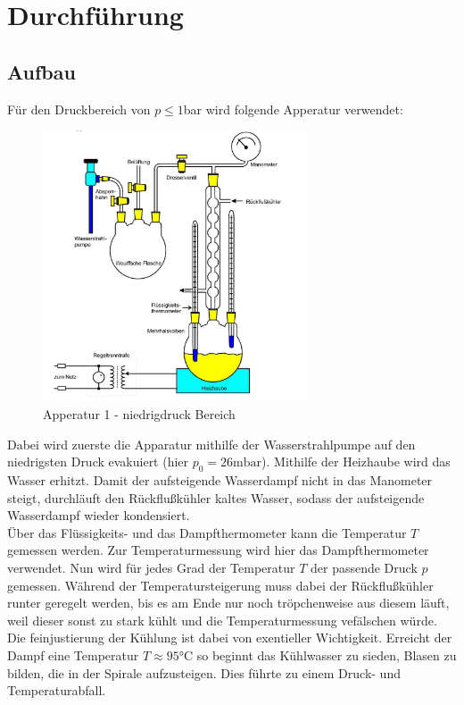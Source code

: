 \section{Durchführung}
\label{sec:Durchfuehrung}
\subsection{Aufbau}
Für den Druckbereich von $p\leq 1$bar wird folgende Apperatur verwendet:
\begin{figure}[H]
    \centering
    \includegraphics[width=0.7\textwidth]{bilder/anlage1.jpg}
    \caption{Apperatur 1 - niedrigdruck Bereich \cite[181]{Anleitung}}
    \label{fig:app1}
\end{figure}
Dabei wird zuerste die Apparatur mithilfe der Wasserstrahlpumpe auf
den niedrigsten Druck evakuiert (hier $p_0=26\mathrm{mbar}$).
Mithilfe der Heizhaube wird das Wasser erhitzt. Damit der aufsteigende Wasserdampf
nicht in das Manometer steigt, durchläuft den Rückflußkühler kaltes Wasser,
sodass der aufsteigende Wasserdampf wieder kondensiert.\\
Über das Flüssigkeits- und das Dampfthermometer kann die Temperatur $T$ gemessen werden.
Zur Temperaturmessung wird hier das Dampfthermometer verwendet. 
Nun wird für jedes Grad der Temperatur $T$ der passende Druck $p$ gemessen.
Während der Temperatursteigerung muss dabei der Rückflußkühler runter geregelt werden, bis es am
Ende nur noch tröpchenweise aus diesem läuft, weil dieser sonst zu stark kühlt und die Temperaturmessung vefälschen würde. \\
Die feinjustierung der Kühlung ist dabei von exentieller Wichtigkeit.
Erreicht der Dampf eine Temperatur $T \approx 95°$C so beginnt
das Kühlwasser zu sieden, Blasen zu bilden, die in der Spirale
aufzusteigen. Dies führte zu einem Druck- und Temperaturabfall.\\


